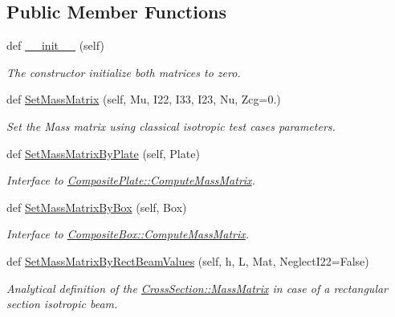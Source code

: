 \subsection*{Public Member Functions}
\begin{DoxyCompactItemize}
\item 
def \hyperlink{classgebtaero_1_1_cross_section_1_1_cross_section_a26142f8a77b098b8725d7d024cfd5199}{\+\_\+\+\_\+init\+\_\+\+\_\+} (self)
\begin{DoxyCompactList}\small\item\em The constructor initialize both matrices to zero. \end{DoxyCompactList}\item 
def \hyperlink{classgebtaero_1_1_cross_section_1_1_cross_section_a09866889e6a297e305d32daa5d57e1cb}{Set\+Mass\+Matrix} (self, Mu, I22, I33, I23, Nu, Zcg=0.)
\begin{DoxyCompactList}\small\item\em Set the Mass matrix using classical isotropic test cases parameters. \end{DoxyCompactList}\item 
def \hyperlink{classgebtaero_1_1_cross_section_1_1_cross_section_a0e87dd20eeef95c96cbbeebc0491fe86}{Set\+Mass\+Matrix\+By\+Plate} (self, Plate)
\begin{DoxyCompactList}\small\item\em Interface to \hyperlink{classgebtaero_1_1_composite_plate_1_1_composite_plate_a13b1222bb715056417c9db9903d264a2}{Composite\+Plate\+::\+Compute\+Mass\+Matrix}. \end{DoxyCompactList}\item 
def \hyperlink{classgebtaero_1_1_cross_section_1_1_cross_section_a4914caf35d9b8cfadafe8e359a590d7c}{Set\+Mass\+Matrix\+By\+Box} (self, Box)
\begin{DoxyCompactList}\small\item\em Interface to \hyperlink{classgebtaero_1_1_composite_box_1_1_composite_box_a6b944eeef7002377d7b83c5dd6ae6550}{Composite\+Box\+::\+Compute\+Mass\+Matrix}. \end{DoxyCompactList}\item 
def \hyperlink{classgebtaero_1_1_cross_section_1_1_cross_section_a7fa57a9ed49c1029409a78f45a45c562}{Set\+Mass\+Matrix\+By\+Rect\+Beam\+Values} (self, h, L, Mat, Neglect\+I22=False)
\begin{DoxyCompactList}\small\item\em Analytical definition of the \hyperlink{classgebtaero_1_1_cross_section_1_1_cross_section_ae9be8649853163b2b4dfdaa3584d9f78}{Cross\+Section\+::\+Mass\+Matrix} in case of a rectangular section isotropic beam. \end{DoxyCompactList}\item 

\end{DoxyCompactItemize}
